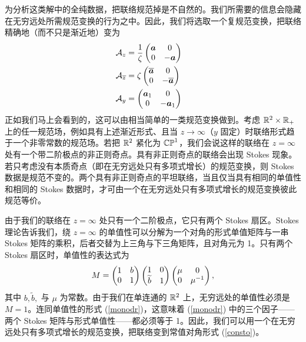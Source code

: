 为分析这类解中的全纯数据，把联络规范掉是不自然的。我们所需要的信息会隐藏在无穷远处所需规范变换的行为之中。因此，我们将选取一个复规范变换，把联络精确地（而不只是渐近地）变为
\begin{align}\label{consto}
\A_z &=\frac{1}{\zeta} \begin{pmatrix} \ca & 0 \cr 0 & -\ca \end{pmatrix} \cr
\A_{\bar z} &= \zeta \begin{pmatrix} \bar \ca & 0 \cr 0 & - \bar \ca \end{pmatrix} \cr
\A_y &= \begin{pmatrix} \ca_1 & 0 \cr 0 & -\ca_1 \end{pmatrix} \cr
\end{align}
正如我们马上会看到的，这可以由相当简单的一类规范变换做到。考虑 $\R^2\times \R_+$ 上的任一规范场，例如具有上述渐近形式、且当 $z\to\infty$（$y$ 固定）时联络形式趋于一个非零常数的规范场。若把 $\R^2$ 紧化为 $\CP^1$，我们会说这样的联络在 $z=\infty$ 处有一个带二阶极点的非正则奇点。具有非正则奇点的联络会出现 Stokes 现象。若只考虑没有本质奇点（即在无穷远处只有多项式增长）的规范变换，则 Stokes 数据是规范不变的。两个具有非正则奇点的平坦联络，当且仅当具有相同的单值性和相同的 Stokes 数据时，才可由一个在无穷远处只有多项式增长的规范变换彼此规范等价。

由于我们的联络在 $z=\infty$ 处只有一个二阶极点，它只有两个 Stokes 扇区。Stokes 理论告诉我们，绕 $z=\infty$ 的单值性可以分解为一个对角的形式单值矩阵与一串 Stokes 矩阵的乘积，后者交替为上三角与下三角矩阵，且对角元为 1。只有两个 Stokes 扇区时，单值性的表达式为
\begin{equation}\label{monodr}M=
\begin{pmatrix}1 & b \cr 0 & 1 \end{pmatrix}\begin{pmatrix}1 & 0 \cr \tilde b & 1 \end{pmatrix}\begin{pmatrix}\mu & 0 \cr 0 & \mu^{-1} \end{pmatrix} ,\end{equation}
其中 $b,\tilde b,$ 与 $\mu$ 为常数。由于我们在单连通的 $\R^2$ 上，无穷远处的单值性必须是 $M=1$。连同单值性的形式 (\ref{monodr})，这意味着 (\ref{monodr}) 中的三个因子——两个 Stokes 矩阵与形式单值性——都必须等于 1。因此，我们可以用一个在无穷远处只有多项式增长的规范变换，把联络变到常值对角形式 (\ref{consto})。


